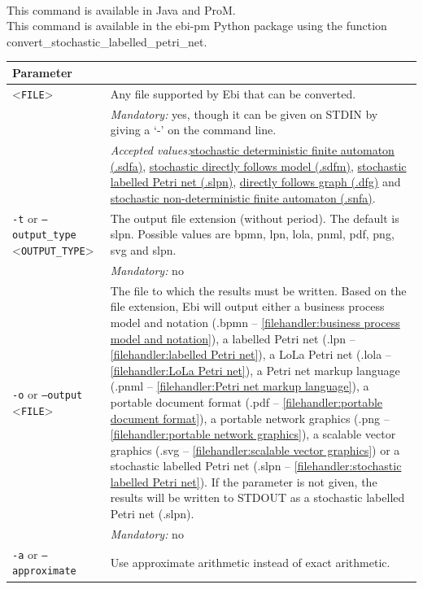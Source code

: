 {\\This command is available in Java and ProM.
\\This command is available in the ebi-pm Python package using the function convert\_stochastic\_labelled\_petri\_net.
\begin{tabularx}{\linewidth}{lX}
\toprule
Parameter \\\midrule
<\texttt{FILE}>&Any file supported by Ebi that can be converted.\\
&\textit{Mandatory:} \quad yes, though it can be given on STDIN by giving a `-' on the command line.\\
&\textit{Accepted values:}\quad \hyperref[filehandler:stochastic deterministic finite automaton]{stochastic deterministic finite automaton (.sdfa)}, \hyperref[filehandler:stochastic directly follows model]{stochastic directly follows model (.sdfm)}, \hyperref[filehandler:stochastic labelled Petri net]{stochastic labelled Petri net (.slpn)}, \hyperref[filehandler:directly follows graph]{directly follows graph (.dfg)} and \hyperref[filehandler:stochastic non-deterministic finite automaton]{stochastic non-deterministic finite automaton (.snfa)}.\\
\texttt{-t} or \texttt{--output\_type} <\texttt{OUTPUT\_TYPE}> &
The output file extension (without period). The default is slpn. Possible values are bpmn, lpn, lola, pnml, pdf, png, svg and slpn.\\
&\textit{Mandatory:} \quad no\\
\texttt{-o} or \texttt{--output} <\texttt{FILE}> &
The file to which the results must be written. Based on the file extension, Ebi will output either a business process model and notation (.bpmn -- \cref{filehandler:business process model and notation}), a labelled Petri net (.lpn -- \cref{filehandler:labelled Petri net}), a LoLa Petri net (.lola -- \cref{filehandler:LoLa Petri net}), a Petri net markup language (.pnml -- \cref{filehandler:Petri net markup language}), a portable document format (.pdf -- \cref{filehandler:portable document format}), a portable network graphics (.png -- \cref{filehandler:portable network graphics}), a scalable vector graphics (.svg -- \cref{filehandler:scalable vector graphics}) or a stochastic labelled Petri net (.slpn -- \cref{filehandler:stochastic labelled Petri net}).
If the parameter is not given, the results will be written to STDOUT as a stochastic labelled Petri net (.slpn).\\
&\textit{Mandatory:} \quad no\\
\texttt{-a} or \texttt{--approximate} & Use approximate arithmetic instead of exact arithmetic.\\

\end{tabularx}}
